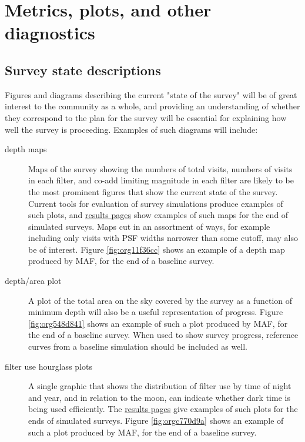 \section{Metrics, plots, and other diagnostics}
\label{sec:org922c37a}
\subsection{Survey state descriptions}
\label{sec:org3a7f0df}
Figures and diagrams describing the current "state of the survey" will be of great interest to the community as a whole, and providing an understanding of whether they correspond to the plan for the survey will be essential for explaining how well the survey is proceeding.
Examples of such diagrams will include:

\begin{description}
\item[{depth maps}] Maps of the survey showing the numbers of total visits, numbers of visits in each filter, and co-add limiting magnitude in each filter are likely to be the most prominent figures that show the current state of the survey. Current tools for evaluation of survey simulations produce examples of such plots, and \href{http://astro-lsst-01.astro.washington.edu:8081/allMetricResults?runId=392\#Basic\%20Maps}{results pages} show examples of such maps for the end of simulated surveys. Maps cut in an assortment of ways, for example including only visits with PSF widths narrower than some cutoff, may also be of interest. Figure \ref{fig:org11f36cc} shows an example of a depth map produced by MAF, for the end of a baseline survey.
\item[{depth/area plot}] A plot of the total area on the sky covered by the survey as a function of minimum depth will also be a useful representation of progress. Figure \ref{fig:org548d841} shows an example of such a plot produced by MAF, for the end of a baseline survey. When used to show survey progress, reference curves from a baseline simulation should be included as well.
\item[{filter use hourglass plots}] A single graphic that shows the distribution of filter use by time of night and year, and in relation to the moon, can indicate whether dark time is being used efficiently. The \href{http://astro-lsst-01.astro.washington.edu:8081/allMetricResults?runId=392\#Hourglass}{results pages} give examples of such plots for the ends of simulated surveys. Figure \ref{fig:orgc770d9a} shows an example of such a plot produced by MAF, for the end of a baseline survey.

\end{description}

